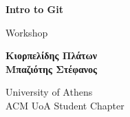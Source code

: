 \begin{titlepage}
	\begin{center}
		\vspace*{1cm}
		\Huge
		\textbf{{\la Intro to Git}}
		
		\vspace{0.5cm}
		\LARGE
		{\sf \la Workshop}

		\vspace{1.5cm}
		\normalsize
		\textbf{Κιορπελίδης Πλάτων}\\
		\textbf{Μπαζιότης Στέφανος}

		\vfill
		

		\LARGE
		{\sf \la University of Athens}\\
		{\sf \la ACM UoA Student Chapter}

	\end{center}
\end{titlepage}

